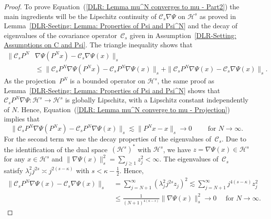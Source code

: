\begin{proof}
  To prove Equation~(\ref{DLR: Lemma mu^N converges to mu - Part2}) the main ingredients will be the Lipschitz continuity of $\mathcal{C}_s \nabla \Psi$ on $\mathcal{H}^s$ as proved in Lemma~\ref{DLR-Seeting: Lemma: Properties of Psi and Psi^N} and the decay of eigenvalues of the covariance operator~$\mathcal{C}_s$ given in Assumption~\ref{DLR-Setting: Assumptions on C and Psi}. The triangle inequality shows that
  \begin{equation*}
    \begin{split}
     \|  \mathcal{C}_s P^N & \nabla  \Psi(P^Nx)  - \mathcal{C}_s \nabla \Psi(x) \|_s \\
     & \leq \|  \mathcal{C}_s P^N  \nabla  \Psi(P^Nx)  - \mathcal{C}_s P^N \nabla \Psi(x) \|_s + \|  \mathcal{C}_s P^N  \nabla  \Psi(x)  - \mathcal{C}_s \nabla \Psi(x) \|_s.
    \end{split}
  \end{equation*}
  As the projection~$P^N$ is a bounded operator on $\mathcal{H}^s$, the same proof as Lemma~\ref{DLR-Seeting: Lemma: Properties of Psi and Psi^N} shows that $\mathcal{C}_sP^N\nabla \Psi : \mathcal{H}^s \to \mathcal{H}^s$ is globally Lipschitz, with a Lipschitz constant independently of $N$. Hence, Equation~(\ref{DLR: Lemma mu^N converge to mu - Projection}) implies that
  \begin{equation*}
    \|  \mathcal{C}_s P^N  \nabla  \Psi(P^Nx)  - \mathcal{C}_s P^N \nabla \Psi(x) \|_s \lesssim  \| P^N x - x \|_s \to 0 \qquad \text{ for } N \to \infty.
  \end{equation*}
  For the second term we use the decay properties of the eigenvalues of~$\mathcal{C}_s$. Due to the identification of the dual space~$(\mathcal{H}^s)^*$ with $\mathcal{H}^s$, we have $z = \nabla \Psi (x) \in \mathcal{H}^s$ for any $x \in \mathcal{H}^s$ and $\| \nabla \Psi (x) \|_s^2 = \sum_{j \geq 1} z_j^2 < \infty$. The eigenvalues of~$\mathcal{C}_s$ satisfy $\lambda_j^2 j^{2s} \asymp j^{2(s-\kappa)}$ with $s < \kappa - \tfrac{1}{2}$. Hence,
    \begin{equation*}
    \begin{split}
     \|  \mathcal{C}_s P^N  \nabla  \Psi(x)  - \mathcal{C}_s \nabla \Psi(x) \|_s  & \; = \sum_{j = N+1}^{\infty} (\lambda_j^2 j^{2s} z_j)^2 \lesssim \sum_{j = N+1}^{\infty} j^{4(s-\kappa)} z_j^2 \\
     & \; \leq \frac{1}{(N+1)^{4(\kappa - s)}} \| \nabla \Psi (x) \|_s^2 \to 0 \quad \text{ for } N \to \infty.
    \end{split}
  \end{equation*}

\end{proof}




